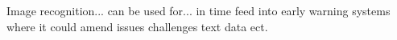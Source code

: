 \documentclass[a4paper]{article}
\begin{document}





Image recognition... can be used for... in time feed into early warning systems where it could amend issues challenges text data ect.


\end{document}
